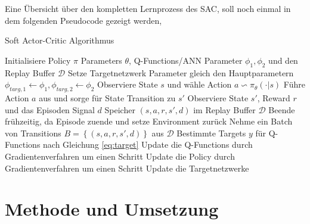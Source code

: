 \documentclass[]{iat}
\begin{document}
\newpage
Eine Übersicht über den kompletten Lernprozess des SAC, soll noch einmal in dem folgenden Pseudocode gezeigt werden,
\begin{algorithm}[H]
    \caption{Soft Actor-Critic Algorithmus}\label{pse:sac_pseudo}
    \begin{algorithmic}[1]
        \State Initialisiere Policy $\pi$ Parameters $\theta$, Q-Functions/ANN Parameter $\phi_1, \phi_2$ und den Replay Buffer $\mathcal{D}$
        \State Setze Targetnetzwerk Parameter gleich den Hauptparametern $\phi_{targ,1} \leftarrow \phi_1, \phi_{targ,2} \leftarrow \phi_2$
        \State Observiere State $s$ und wähle Action $a \backsim \pi_{\theta}(\cdot | s)$
        \State Führe Action $a$ aus und sorge für State Transition zu $s'$
        \State Observiere State $s'$, Reward $r$ und das Episoden Signal $d$
        \State Speicher $(s, a, r, s', d)$ im Replay Buffer $\mathcal{D}$
        \State Beende frühzeitig, da Episode zuende und setze Environment zurück
        \EndIf
        \State Nehme ein Batch von Transitions $B = \left\{(s, a, r, s', d)\right\}$ aus $\mathcal{D}$
        \State Bestimmte Targets $y$ für Q-Functions nach Gleichung \ref{eq:target}
        \State Update die Q-Functions durch Gradientenverfahren um einen Schritt
        \State Update die Policy durch Gradientenverfahren um einen Schritt
        \State Update die Targetnetzwerke
        \EndFor
        \EndIf
        \EndFor
    \end{algorithmic}
\end{algorithm}

\chapter{Methode und Umsetzung} \label{sec:methode_umsetzung}
\end{document}
